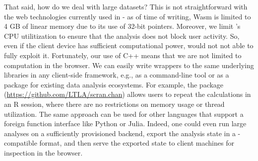 \documentclass{article}
\begin{document}
That said, how do we deal with large datasets?
This is not straightforward with the web technologies currently used in  - 
as of time of writing, Wasm is limited to 4 GB of linear memory due to its use of 32-bit pointers.
Moreover, we limit 's CPU utilitization to ensure that the analysis does not block user activity.
So, even if the client device has sufficient computational power,  would not not able to fully exploit it.
Fortunately, our use of C++ means that we are not limited to computation in the browser.
We can easily write wrappers to the same underlying libraries in any client-side framework, e.g., as a command-line tool or as a package for existing data analysis ecosystems.
For example, the  package (\url{https://github.com/LTLA/scran.chan}) allows users to repeat the  calculations in an R session,
where there are no restrictions on memory usage or thread utilization.
The same approach can be used for other languages that support a foreign function interface like Python or Julia.
Indeed, one could even run large analyses on a sufficiently provisioned backend, 
export the analysis state in a -compatible format,
and then serve the exported state to client machines for inspection in the browser. 
    




\end{document}

